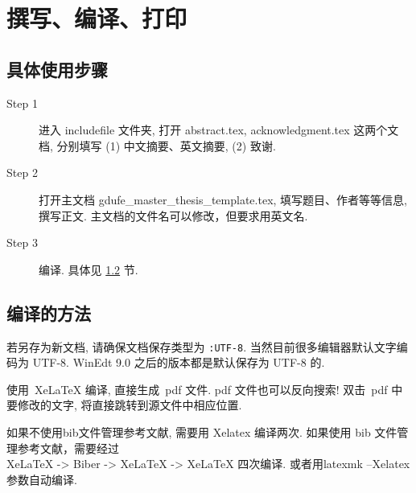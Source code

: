 \setlength{\baselineskip}{20pt} \selectfont
\chapter{撰写、编译、打印\the\baselineskip}
\the\baselineskip
\section{具体使用步骤\the\baselineskip}
\the\baselineskip
\begin{description}

    \item[Step 1]  进入 includefile 文件夹,  打开 abstract.tex, acknowledgment.tex 这两个文档, 分别填写 (1) 中文摘要、英文摘要, (2) 致谢.\the\baselineskip

    \item[Step 2]  打开主文档 gdufe\_master\_thesis\_template.tex, 填写题目、作者等等信息, 撰写正文. 主文档的文件名可以修改，但要求用英文名.

    \item[Step 3]  编译. 具体见 \ref{sec-compile} 节.

\end{description}

\section{编译的方法}\label{sec-compile}
若另存为新文档, 请确保文档保存类型为 \verb|:UTF-8|. 当然目前很多编辑器默认文字编码为 UTF-8.
WinEdt 9.0 之后的版本都是默认保存为 UTF-8 的. \the\baselineskip

使用~XeLaTeX 编译, 直接生成~pdf 文件.
pdf 文件也可以反向搜索! 双击~pdf 中要修改的文字, 将直接跳转到源文件中相应位置.

如果不使用bib文件管理参考文献, 需要用 Xelatex 编译两次.
如果使用 bib 文件管理参考文献，需要经过\\
XeLaTeX -> Biber -> XeLaTeX -> XeLaTeX 四次编译. \the\baselineskip
或者用latexmk --Xelatex 参数自动编译.



